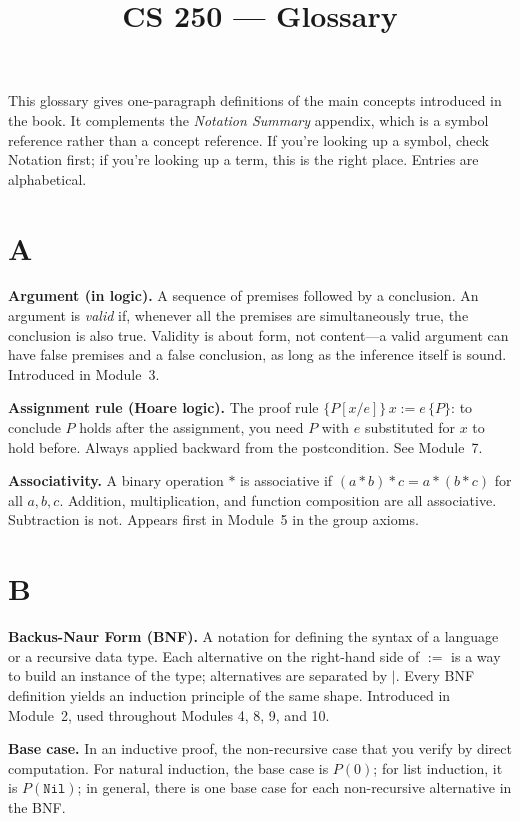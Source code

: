 \documentclass[11pt]{article}
\title{CS 250 --- Glossary}
\author{}
\date{}
\begin{document}
\maketitle

This glossary gives one-paragraph definitions of the main concepts introduced
in the book. It complements the \emph{Notation Summary} appendix, which is a
symbol reference rather than a concept reference. If you're looking up a
symbol, check Notation first; if you're looking up a term, this is the right
place. Entries are alphabetical.

\section*{A}

\textbf{Argument (in logic).} A sequence of premises followed by a conclusion. An argument is \emph{valid} if, whenever all the premises are simultaneously true, the conclusion is also true. Validity is about form, not content---a valid argument can have false premises and a false conclusion, as long as the inference itself is sound. Introduced in Module~3.

\textbf{Assignment rule (Hoare logic).} The proof rule $\{P[x/e]\}\, x := e\, \{P\}$: to conclude $P$ holds after the assignment, you need $P$ with $e$ substituted for $x$ to hold before. Always applied backward from the postcondition. See Module~7.

\textbf{Associativity.} A binary operation $*$ is associative if $(a * b) * c = a * (b * c)$ for all $a, b, c$. Addition, multiplication, and function composition are all associative. Subtraction is not. Appears first in Module~5 in the group axioms.

\section*{B}

\textbf{Backus-Naur Form (BNF).} A notation for defining the syntax of a language or a recursive data type. Each alternative on the right-hand side of $:=$ is a way to build an instance of the type; alternatives are separated by $\mid$. Every BNF definition yields an induction principle of the same shape. Introduced in Module~2, used throughout Modules 4, 8, 9, and 10.

\textbf{Base case.} In an inductive proof, the non-recursive case that you verify by direct computation. For natural induction, the base case is $P(0)$; for list induction, it is $P(\texttt{Nil})$; in general, there is one base case for each non-recursive alternative in the BNF.
\end{document}
